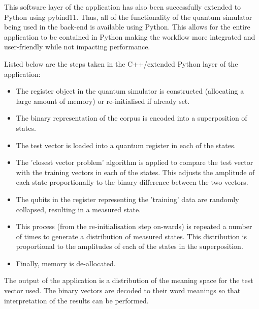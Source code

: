 This software layer of the application has also been successfully extended to Python using pybind11. Thus, all of the functionality of the quantum simulator being used in the back-end is available using Python. This allows for the entire application to be contained in Python making the workflow more integrated and user-friendly while not impacting performance.

Listed below are the steps taken in the C++/extended Python layer of the application:
\begin{itemize}
    \item The register object in the quantum simulator is constructed (allocating a large amount of memory) or re-initialised if already set.
    \item The binary representation of the corpus is encoded into a superposition of states.
    \item The test vector is loaded into a quantum register in each of the states.
    \item The 'closest vector problem' algorithm is applied to compare the test vector with the training vectors in each of the states. This adjusts the amplitude of each state proportionally to the binary difference between the two vectors.
    \item The qubits in the register representing the 'training' data are randomly collapsed, resulting in a measured state.
    \item This process (from the re-initialisation step on-wards) is repeated a number of times to generate a distribution of measured states. This distribution is proportional to the amplitudes of each of the states in the superposition.
    \item Finally, memory is de-allocated.
\end{itemize}

The output of the application is a distribution of the meaning space for the test vector used. The binary vectors are decoded to their word meanings so that interpretation of the results can be performed.


